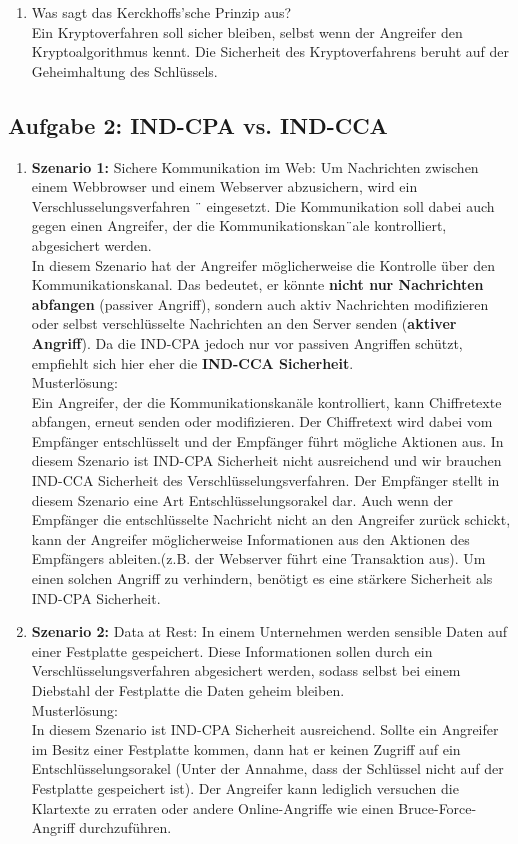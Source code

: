 \documentclass[a4paper, 10pt]{article}
\begin{document}
\begin{enumerate} [label=(\alph*)]
    \item Was sagt das Kerckhoffs’sche Prinzip aus?\\[2mm]
    Ein Kryptoverfahren soll sicher bleiben, selbst wenn der Angreifer den Kryptoalgorithmus kennt. Die Sicherheit des Kryptoverfahrens beruht auf der Geheimhaltung des Schlüssels.
\end{enumerate}

\subsection{Aufgabe 2: IND-CPA vs. IND-CCA}
\begin{enumerate} [label=(\alph*)]
    \item \textbf{Szenario 1:} Sichere Kommunikation im Web: Um Nachrichten zwischen einem
    Webbrowser und einem Webserver abzusichern, wird ein Verschlusselungsverfahren ¨
    eingesetzt. Die Kommunikation soll dabei auch gegen einen Angreifer, der die
    Kommunikationskan¨ale kontrolliert, abgesichert werden.\\[2.5mm]
    In diesem Szenario hat der Angreifer möglicherweise die Kontrolle über den Kommunikationskanal. Das bedeutet, er könnte \textbf{nicht nur Nachrichten abfangen} (passiver Angriff), sondern auch aktiv Nachrichten modifizieren oder selbst verschlüsselte Nachrichten an den Server senden (\textbf{aktiver Angriff}).
    Da die IND-CPA jedoch nur vor passiven Angriffen schützt, empfiehlt sich hier eher die \textbf{IND-CCA Sicherheit}.\\[3mm]
    Musterlösung:\\[2mm]
    Ein Angreifer, der die Kommunikationskanäle kontrolliert, kann Chiffretexte abfangen, erneut senden oder modifizieren. Der Chiffretext wird dabei vom Empfänger entschlüsselt und der Empfänger führt mögliche Aktionen aus. In diesem Szenario ist IND-CPA Sicherheit nicht ausreichend und wir brauchen IND-CCA Sicherheit des Verschlüsselungsverfahren. Der Empfänger stellt in diesem Szenario eine Art Entschlüsselungsorakel dar. Auch wenn der Empfänger die entschlüsselte Nachricht nicht an den Angreifer zurück schickt, kann der Angreifer möglicherweise Informationen aus den Aktionen des Empfängers ableiten.(z.B. der Webserver führt eine Transaktion aus). Um einen solchen Angriff zu verhindern, benötigt es eine stärkere Sicherheit als IND-CPA Sicherheit.
    \item\textbf{Szenario 2:} Data at Rest: In einem Unternehmen werden sensible Daten auf einer Festplatte gespeichert. Diese Informationen sollen durch ein Verschlüsselungsverfahren
    abgesichert werden, sodass selbst bei einem Diebstahl der Festplatte die Daten geheim bleiben.\\[2mm]
    Musterlösung:\\[2mm]
    In diesem Szenario ist IND-CPA Sicherheit ausreichend. Sollte ein Angreifer im Besitz einer Festplatte kommen, dann hat er keinen Zugriff auf ein Entschlüsselungsorakel (Unter der Annahme, dass der Schlüssel nicht auf der Festplatte gespeichert ist).
    Der Angreifer kann lediglich versuchen die Klartexte zu erraten oder andere Online-Angriffe wie einen Bruce-Force-Angriff durchzuführen.

\end{enumerate}
\end{document}
